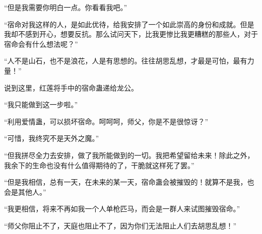 \begin{this_body}
“但是我需要你明白一点。你看看我吧。”

“宿命对我这样的人，是如此优待，给我安排了一个如此崇高的身份和成就。但是我却不感到开心，想要反抗。那么试问天下，比我更惨比我更糟糕的那些人，对于宿命会有什么想法呢？”

“人不是山石，也不是浪花，人是有思想的。往往胡思乱想，才最是可怕，最有力量！”

说到这里，红莲将手中的宿命蛊递给龙公。

“我只能做到这一步啦。”

“利用爱情蛊，可以损坏宿命。呵呵呵，师父，你是不是很惊讶？”

“可惜，我终究不是天外之魔。”

“但我拼尽全力去安排，做了我所能做到的一切。我把希望留给未来！除此之外，我余下的生命也没有什么值得期待的了，干脆就这样死了罢。”

“但是我相信，总有一天，在未来的某一天，宿命蛊会被摧毁的！就算不是我，也会是其他人。”

“我更相信，将来不再如我一个人单枪匹马，而会是一群人来试图摧毁宿命。”

“师父你阻止不了，天庭也阻止不了，因为你们无法阻止人们去胡思乱想！”

\end{this_body}

